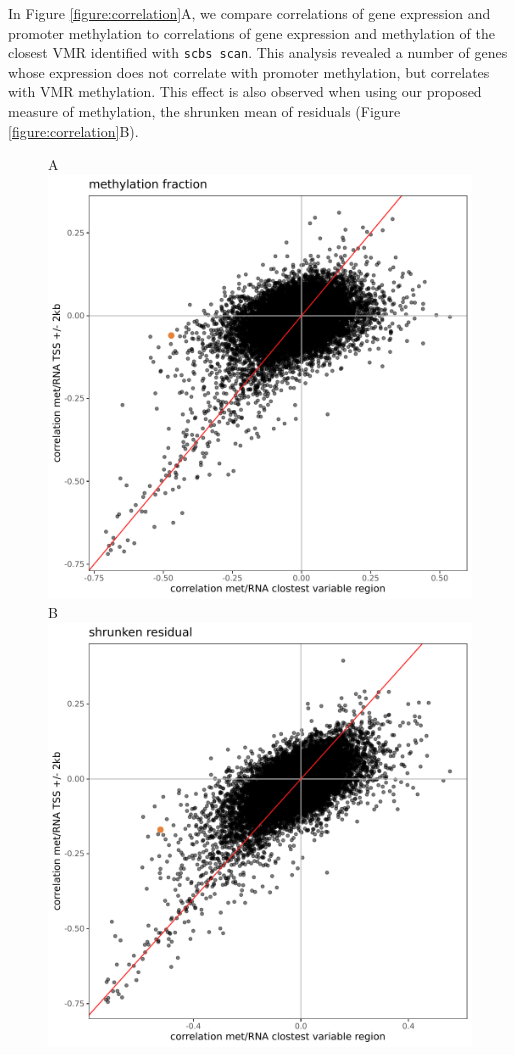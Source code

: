 \documentclass[twocolumn,10pt]{article}
\begin{document}
In Figure \ref{figure:correlation}A, we compare correlations of gene expression and promoter methylation to correlations of gene expression and methylation of the closest VMR identified with \texttt{scbs scan}.
This analysis revealed a number of genes whose expression does not correlate with promoter methylation, but correlates with VMR methylation.
This effect is also observed when using our proposed measure of methylation, the shrunken mean of residuals (Figure \ref{figure:correlation}B).

\begin{figure}
    \begin{center}
    A\hspace{.9\columnwidth}~\\
    \includegraphics[width=.7\columnwidth]{part_leonie_git/leonie_plots/corr_methylation_fraction_4kbwindow.pdf} \\
    B\hspace{.9\columnwidth}~\\
    \includegraphics[width=.7\columnwidth]{part_leonie_git/leonie_plots/corr_shrunken_residual_4kbwindow.pdf} \\

\end{center}
\end{figure}
\end{document}
